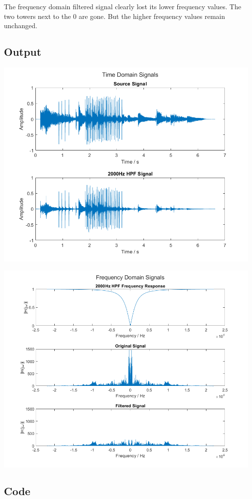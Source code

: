 \documentclass[11pt]{article}
\begin{document}
The frequency domain filtered signal clearly lost its
lower frequency values. The two towers next to the 0 are gone. 
But the higher frequency values remain unchanged.

\subsection{Output}

\includegraphics[height=0.5\textheight]{hpf_time.png}

\includegraphics[height=0.5\textheight]{hpf_frequency.png}

\subsection{Code}
\end{document}
